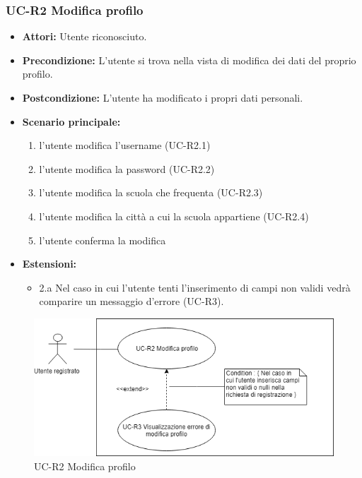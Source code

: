 \subsubsection{UC-R2 Modifica profilo}
		\begin{itemize}
			\item \textbf{Attori:} Utente riconosciuto.
			\item \textbf{Precondizione:} L'utente si trova nella vista di modifica dei dati del proprio profilo.
			\item \textbf{Postcondizione:} L'utente ha modificato i propri dati personali.
			\item \textbf{Scenario principale:}
				\begin{enumerate}
					\item l'utente modifica l'username (UC-R2.1)
					\item  l'utente modifica la password (UC-R2.2)
					\item l'utente modifica la scuola che frequenta (UC-R2.3) 
					\item l'utente modifica la città a cui la scuola appartiene (UC-R2.4)
					\item l'utente conferma la modifica
				\end{enumerate}
				\item \textbf{Estensioni:}
				\begin{itemize}
					\item 2.a Nel caso in cui l'utente tenti l'inserimento di campi non validi vedrà comparire un messaggio d'errore (UC-R3).
				\end{itemize}
		\end{itemize}
		\begin{figure}[htbp]
			\centering
			\includegraphics[scale=0.7]{images/UC-R2.png}
			\caption{UC-R2 Modifica profilo}
		\end{figure}
		
